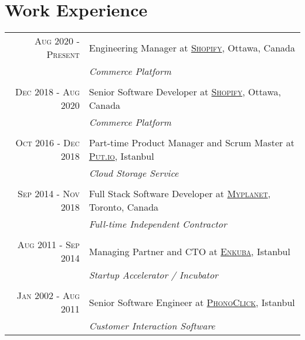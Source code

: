 \documentclass[a4paper,10pt]{article}
\begin{document}
\section{Work Experience}
\begin{tabular}{r|p{11cm}}
  \textsc{Aug 2020 - Present}   & Engineering Manager at \href{https://shopify.com}{\textsc{Shopify}}, Ottawa, Canada \\
                                & \emph{Commerce Platform} \\

  \multicolumn{2}{c}{} \\

  \textsc{Dec 2018 - Aug 2020}   & Senior Software Developer at \href{https://shopify.com}{\textsc{Shopify}}, Ottawa, Canada \\
                                & \emph{Commerce Platform} \\

  \multicolumn{2}{c}{} \\

  \textsc{Oct 2016 - Dec 2018}  & Part-time Product Manager and Scrum Master at \href{https://put.io}{\textsc{Put.io}}, Istanbul \\
                                & \emph{Cloud Storage Service} \\

  \multicolumn{2}{c}{} \\

  \textsc{Sep 2014 - Nov 2018}  & Full Stack Software Developer at \href{https://www.myplanet.com}{\textsc{Myplanet}}, Toronto, Canada \\
                                & \emph{Full-time Independent Contractor} \\

  \multicolumn{2}{c}{} \\

  \textsc{Aug 2011 - Sep 2014}  & Managing Partner and CTO at \href{http://www.enkuba.com}{\textsc{Enkuba}}, Istanbul \\
                                & \emph{Startup Accelerator / Incubator} \\

  \multicolumn{2}{c}{} \\

  \textsc{Jan 2002 - Aug 2011}  & Senior Software Engineer at \href{http://www.phonoclick.com}{\textsc{PhonoClick}}, Istanbul \\
                                & \emph{Customer Interaction Software}  \\


\end{tabular}
\end{document}
